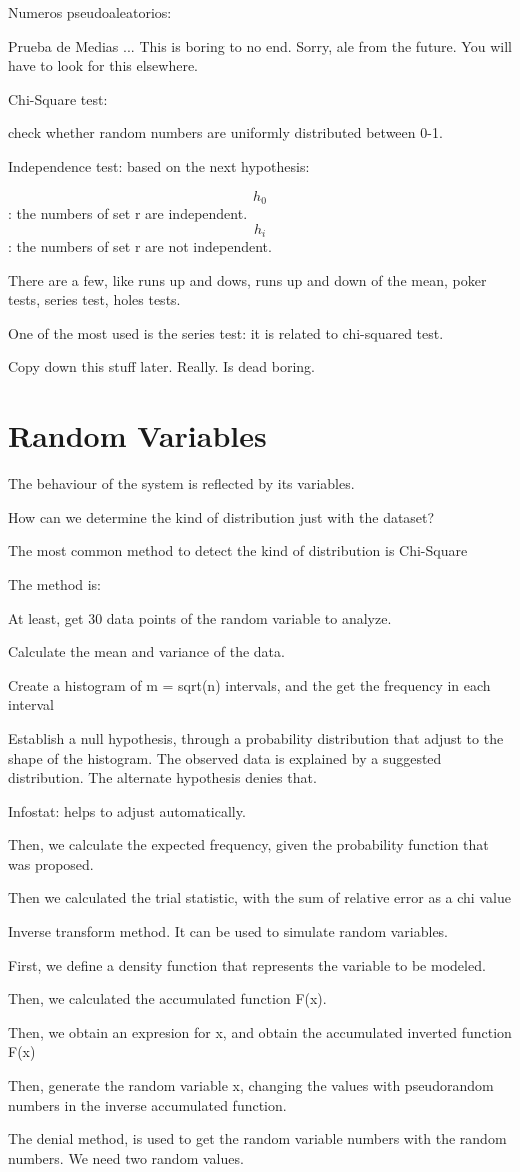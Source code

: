 

Numeros pseudoaleatorios:

Prueba de Medias
... This is boring to no end. Sorry, ale from the future. You will have to look for this elsewhere.

Chi-Square test:

check whether random numbers are uniformly distributed between 0-1.

Independence test: based on the next hypothesis:

$$h_0$$ : the numbers of set r are independent.
$$h_i$$ : the numbers of set r are not independent.

There are a few, like runs up and dows, runs up and down of the mean, poker tests, series test, holes tests.

One of the most used is the series test: it is related to chi-squared test.

Copy down this stuff later. Really. Is dead boring.

\section{Random Variables}

The behaviour of the system is reflected by its variables.

How can we determine the kind of distribution just with the dataset?

The most common method to detect the kind of distribution is Chi-Square

The method is:

At least, get 30 data points of the random variable to analyze.

Calculate the mean and variance of the data.

Create a histogram of m = sqrt(n) intervals, and the get the frequency in each interval

Establish a null hypothesis, through a probability distribution that adjust to the shape of the histogram. The observed data is explained by a suggested distribution. The alternate hypothesis denies that.

Infostat: helps to adjust automatically.

Then, we calculate the expected frequency, given the probability function that was proposed.

Then we calculated the trial statistic, with the sum of relative error as a chi value

Inverse transform method. It can be used to simulate random variables.

First, we define a density function that represents the variable to be modeled.

Then, we calculated the accumulated function F(x).

Then, we obtain an expresion for x, and obtain the accumulated inverted function F(x)~

Then, generate the random variable x, changing the values with pseudorandom numbers in the inverse accumulated function.

The denial method, is used to get the random variable numbers with the random numbers. We need two random values. 

